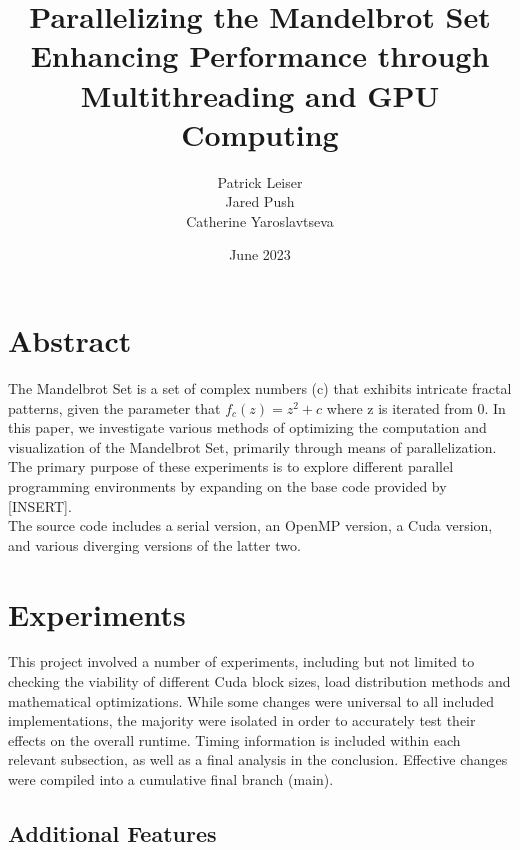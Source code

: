 \documentclass{article}
\begin{document}
\title{\textbf{Parallelizing the Mandelbrot Set \\ \large Enhancing Performance through Multithreading and GPU Computing}}
\author{\begin{tabular}{cc}Patrick Leiser\\
Jared Push\\Catherine Yaroslavtseva\\\end{tabular}}

\date{June 2023}

\maketitle

\section{Abstract}

The Mandelbrot Set is a set of complex numbers (c) that exhibits intricate fractal patterns, given the parameter that $f_c(z) = z^2 + c$ where z is iterated from 0. In this paper, we investigate various methods of optimizing  the computation and visualization of the Mandelbrot Set, primarily through means of parallelization. The primary purpose of these experiments is to explore different parallel programming environments by expanding on the base code provided by [INSERT]. \\ 

The source code includes a serial version, an OpenMP version, a Cuda version, and various diverging versions of the latter two.

\section{Experiments}

This project involved a number of experiments, including but not limited to checking the viability of different Cuda block sizes, load distribution methods and mathematical optimizations. While some changes were universal to all included implementations, the majority were isolated in order to accurately test their effects on the overall runtime. Timing information is included within each relevant subsection, as well as a final analysis in the conclusion. Effective changes were compiled into a cumulative final branch (main).

\subsection{Additional Features}
\end{document}
